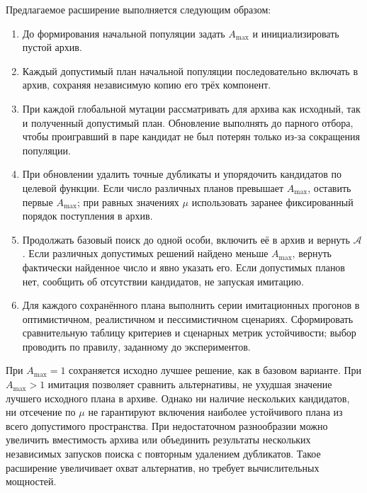 Предлагаемое расширение выполняется следующим образом:
\begin{enumerate}
  \item До формирования начальной популяции задать $A_{\max}$ и инициализировать пустой архив.
  \item Каждый допустимый план начальной популяции последовательно включать в архив, сохраняя независимую копию его трёх компонент.
  \item При каждой глобальной мутации рассматривать для архива как исходный, так и полученный допустимый план. Обновление выполнять до парного отбора, чтобы проигравший в паре кандидат не был потерян только из-за сокращения популяции.
  \item При обновлении удалить точные дубликаты и упорядочить кандидатов по целевой функции. Если число различных планов превышает $A_{\max}$, оставить первые $A_{\max}$; при равных значениях $\mu$ использовать заранее фиксированный порядок поступления в архив.
  \item Продолжать базовый поиск до одной особи, включить её в архив и вернуть $\mathcal A$. Если различных допустимых решений найдено меньше $A_{\max}$, вернуть фактически найденное число и явно указать его. Если допустимых планов нет, сообщить об отсутствии кандидатов, не запуская имитацию.
  \item Для каждого сохранённого плана выполнить серии имитационных прогонов в оптимистичном, реалистичном и пессимистичном сценариях. Сформировать сравнительную таблицу критериев и сценарных метрик устойчивости; выбор проводить по правилу, заданному до экспериментов.
\end{enumerate}

При $A_{\max}=1$ сохраняется исходно лучшее решение, как в базовом варианте. При $A_{\max}>1$ имитация позволяет сравнить альтернативы, не ухудшая значение лучшего исходного плана в архиве. Однако ни наличие нескольких кандидатов, ни отсечение по $\mu$ не гарантируют включения наиболее устойчивого плана из всего допустимого пространства. При недостаточном разнообразии можно увеличить вместимость архива или объединить результаты нескольких независимых запусков поиска с повторным удалением дубликатов. Такое расширение увеличивает охват альтернатив, но требует вычислительных мощностей.

